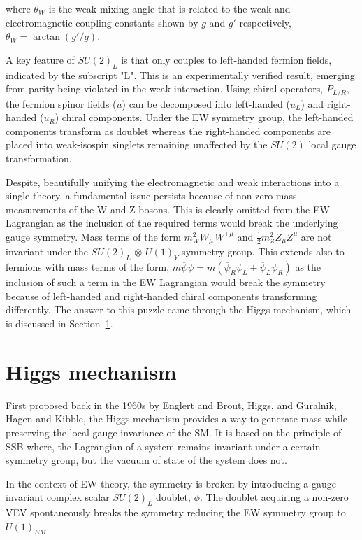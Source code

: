 where $\theta_{W}$ is the weak mixing angle that is related to the weak and electromagnetic coupling constants shown by $g$ and $g'$ respectively, $\theta_{W} = \arctan(g'/g)$.

A key feature of $SU(2)_L$ is that only couples to left-handed fermion fields, indicated by the subscript "L". This is an experimentally verified result, emerging from parity being violated in the weak interaction. Using chiral operators, $P_{L/R}$, the fermion spinor fields ($u$) can be decomposed into left-handed ($u_{L}$) and right-handed ($u_{R}$) chiral components. Under the EW symmetry group, the left-handed components transform as doublet whereas the right-handed components are placed into weak-isospin singlets remaining unaffected by the $SU(2)$ local gauge transformation.

Despite, beautifully unifying the electromagnetic and weak interactions into a single theory, a fundamental issue persists because of non-zero mass measurements of the W and Z bosons. This is clearly omitted from the EW Lagrangian as the inclusion of the required terms would break the underlying gauge symmetry. Mass terms of the form ${m_{W}^2 W_{\mu}^{-} W^{+\mu}}$ and $\frac{1}{2} m_{Z}^{2} Z_{\mu} Z^{\mu}$ are not invariant under the $SU(2)_{L}$ $\otimes$ $U(1)_{Y}$ symmetry group. This extends also to fermions with mass terms of the form, $m\overline{\psi}\psi = m(\overline{\psi}_{R}\psi_{L} + \overline{\psi}_{L}\psi_{R})$ as the inclusion of such a term in the EW Lagrangian would break the symmetry because of left-handed and right-handed chiral components transforming differently. The answer to this puzzle came through the Higgs mechanism, which is discussed in Section~\ref{Section:Introduction_HiggsMechanism}.

\section{Higgs mechanism}
\label{Section:Introduction_HiggsMechanism}
First proposed back in the 1960s by Englert and Brout, Higgs, and Guralnik, Hagen and Kibble, the Higgs mechanism provides a way to generate mass while preserving the local gauge invariance of the SM. It is based on the principle of \ac{SSB} where, the Lagrangian of a system remains invariant under a certain symmetry group, but the vacuum of state of the system does not. 

In the context of EW theory, the symmetry is broken by introducing a gauge invariant complex scalar $SU(2)_{L}$ doublet, $\phi$. The doublet acquiring a non-zero \ac{VEV} spontaneously breaks the symmetry reducing the EW symmetry group to $U(1)_{EM}$.


